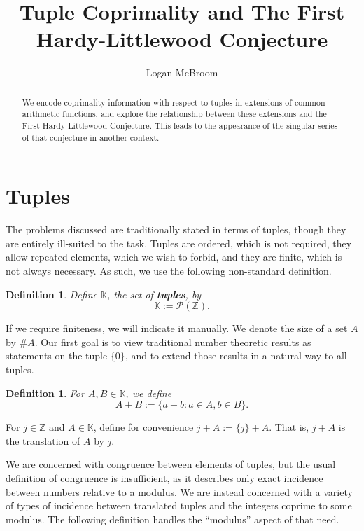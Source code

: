 \documentclass[11pt, leqno]{article}
\newtheorem{definition}[theorem]{Definition}
\begin{document}
\title{Tuple Coprimality and The First \\Hardy-Littlewood Conjecture}
\author{Logan McBroom}
\date{}
\maketitle

\begin{abstract}
    We encode coprimality information with respect to tuples in
    extensions of common arithmetic functions,
    and explore the relationship between these
    extensions and the First Hardy-Littlewood Conjecture.
    This leads to the appearance of the singular series of that conjecture
    in another context.
\end{abstract}

\section{Tuples}

The problems discussed are traditionally stated in terms
of tuples, though they are entirely ill-suited to the task.
Tuples are ordered, which is not required, they allow repeated
elements, which we wish to forbid, and they are finite, which
is not always necessary.
As such, we use the following non-standard definition.

\begin{definition}
Define $\mathbb{K}$, the set of \textbf{tuples}, by
$$\mathbb{K} := \mathscr{P}(\mathbb{Z}).$$
\end{definition}

If we require finiteness, we will indicate it manually.
We denote the size of a set $A$ by $\#A$.
Our first goal is to view traditional number theoretic results
as statements on the tuple $\{0\}$, and to extend those results
in a natural way to all tuples.

\begin{definition}
For $A,B \in\mathbb{K}$, we define
$$A+B := \{a+b : a\in A, b\in B \}.$$
\end{definition}

For $j\in\mathbb{Z}$ and $A\in\mathbb{K}$, define for convenience 
$j+A := \{j\} + A$.
That is, $j+A$ is the translation of $A$ by $j$.

We are concerned with congruence between elements of tuples,
but the usual definition of congruence is insufficient, as it describes only
exact incidence between numbers relative to a modulus.
We are instead concerned with a variety of types of incidence between
translated tuples and the integers coprime to some modulus.
The following definition handles the ``modulus'' aspect of that need.
\end{document}
